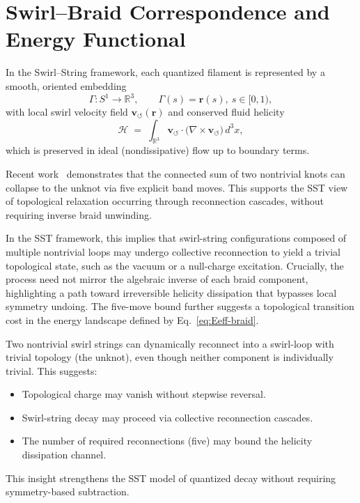 \documentclass[10pt,reprint,aps,onecolumn,nofootinbib]{revtex4-2}
\begin{document}
\section{Swirl–Braid Correspondence and Energy Functional}\label{sec:swirlbraid}

    In the Swirl–String framework, each quantized filament is represented by a smooth, oriented embedding
    \[
        \Gamma: S^1 \to \mathbb{R}^3,\qquad \Gamma(s)=\mathbf{r}(s),\ s\in[0,1),
    \]
    with local swirl velocity field \(\mathbf{v}_{\!\boldsymbol{\circlearrowleft}}(\mathbf{r})\) and conserved fluid helicity
    \[
        \mathcal{H} \;=\; \int_{\mathbb{R}^3} \mathbf{v}_{\!\boldsymbol{\circlearrowleft}}\cdot
        \big(\nabla\times \mathbf{v}_{\!\boldsymbol{\circlearrowleft}}\big)\,d^3x,
    \]
    which is preserved in ideal (nondissipative) flow up to boundary terms.

    Recent work~\cite{PutyraTurner2024} demonstrates that the connected sum of two nontrivial knots can collapse to the unknot via five explicit band moves. This supports the SST view of topological relaxation occurring through reconnection cascades, without requiring inverse braid unwinding.

    In the SST framework, this implies that swirl-string configurations composed of multiple nontrivial loops may undergo collective reconnection to yield a trivial topological state, such as the vacuum or a null-charge excitation. Crucially, the process need not mirror the algebraic inverse of each braid component, highlighting a path toward irreversible helicity dissipation that bypasses local symmetry undoing. The five-move bound further suggests a topological transition cost in the energy landscape defined by Eq.~\eqref{eq:Eeff-braid}.


    \begin{tcolorbox}[colframe=gray,title={Implication of Knot Fusion in SST}]
    Two nontrivial swirl strings can dynamically reconnect into a swirl-loop with trivial topology (the unknot), even though neither component is individually trivial.
    This suggests:
    \begin{itemize}
    \item Topological charge may vanish without stepwise reversal.
    \item Swirl-string decay may proceed via collective reconnection cascades.
    \item The number of required reconnections (five) may bound the helicity dissipation channel.
    \end{itemize}
    This insight strengthens the SST model of quantized decay without requiring symmetry-based subtraction.
    \end{tcolorbox}
\end{document}
